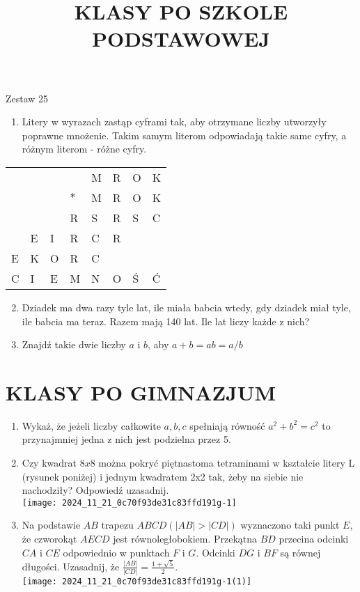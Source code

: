 \documentclass[10pt]{article}
\title{KLASY PO SZKOLE PODSTAWOWEJ }
\author{}
\date{}
\begin{document}
\maketitle
Zestaw 25

\begin{enumerate}
  \item Litery w wyrazach zastąp cyframi tak, aby otrzymane liczby utworzyły poprawne mnożenie. Takim samym literom odpowiadają takie same cyfry, a różnym literom - różne cyfry.
\end{enumerate}

\begin{center}
\begin{tabular}{llllllll}
 &  &  &  & M & R & O & K \\
 &  &  & \(*\) & M & R & O & K \\
\cline { 3 - 8 }
 &  &  & R & S & R & S & C \\
 & E & I & R & C & R &  &  \\
E & K & O & R & C &  &  &  \\
\hline
C & I & E & M & N & O & Ś & Ć \\
\hline
\end{tabular}
\end{center}

\begin{enumerate}
  \setcounter{enumi}{1}
  \item Dziadek ma dwa razy tyle lat, ile miała babcia wtedy, gdy dziadek miał tyle, ile babcia ma teraz. Razem mają 140 lat. Ile lat liczy każde z nich?
  \item Znajdź takie dwie liczby \(a\) i \(b\), aby \(a+b=a b=a / b\)
\end{enumerate}

\section*{KLASY PO GIMNAZJUM}
\begin{enumerate}
  \item Wykaż, że jeżeli liczby całkowite \(a, b, c\) spełniają równość \(a^{2}+b^{2}=c^{2}\) to przynajmniej jedna z nich jest podzielna przez 5.
  \item Czy kwadrat \(8 x 8\) można pokryć piętnastoma tetraminami w kształcie litery L (rysunek poniżej) i jednym kwadratem 2x2 tak, żeby na siebie nie nachodziły? Odpowiedź uzasadnij.\\
\texttt{[image: 2024\_11\_21\_0c70f93de31c83ffd191g-1]}
  \item Na podstawie \(A B\) trapezu \(A B C D(|A B|>|C D|)\) wyznaczono taki punkt \(E\), że czworokąt \(A E C D\) jest równoległobokiem. Przekątna \(B D\) przecina odcinki \(C A\) i \(C E\) odpowiednio w punktach \(F\) i \(G\). Odcinki \(D G\) i \(B F\) są równej długości. Uzasadnij, że \(\frac{|A B|}{|C D|}=\frac{1+\sqrt{5}}{2}\).\\
\texttt{[image: 2024\_11\_21\_0c70f93de31c83ffd191g-1(1)]}
\end{enumerate}
\end{document}
